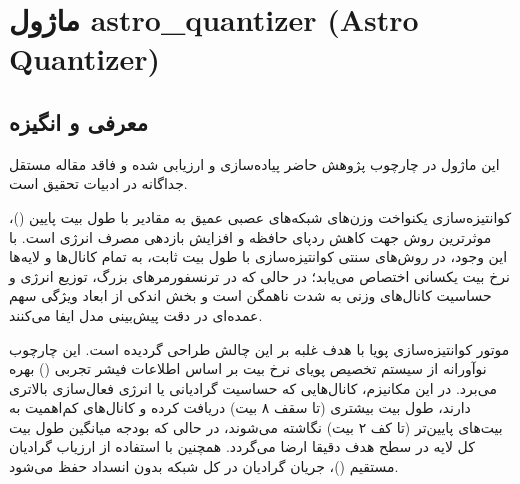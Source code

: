 \section{ماژول astro\_quantizer (Astro Quantizer)}
\label{sec:module_astro_quantizer}

\subsection{معرفی و انگیزه}
این ماژول در چارچوب پژوهش حاضر پیاده‌سازی و ارزیابی شده و فاقد مقاله مستقل جداگانه در ادبیات تحقیق است.

کوانتیزه‌سازی یکنواخت وزن‌های شبکه‌های عصبی عمیق به مقادیر با طول بیت پایین ()، موثرترین روش جهت کاهش ردپای حافظه و افزایش بازدهی مصرف انرژی است. با این وجود، در روش‌های سنتی کوانتیزه‌سازی با طول بیت ثابت، به تمام کانال‌ها و لایه‌ها نرخ بیت یکسانی اختصاص می‌یابد؛ در حالی که در ترنسفورمرهای بزرگ، توزیع انرژی و حساسیت کانال‌های وزنی به شدت ناهمگن است و بخش اندکی از ابعاد ویژگی سهم عمده‌ای در دقت پیش‌بینی مدل ایفا می‌کنند.

موتور کوانتیزه‌سازی پویا  با هدف غلبه بر این چالش طراحی گردیده است. این چارچوب نوآورانه از سیستم تخصیص پویای نرخ بیت بر اساس اطلاعات فیشر تجربی () بهره می‌برد. در این مکانیزم، کانال‌هایی که حساسیت گرادیانی یا انرژی فعال‌سازی بالاتری دارند، طول بیت بیشتری (تا سقف ۸ بیت) دریافت کرده و کانال‌های کم‌اهمیت به بیت‌های پایین‌تر (تا کف ۲ بیت) نگاشته می‌شوند، در حالی که بودجه میانگین طول بیت کل لایه در سطح هدف دقیقا ارضا می‌گردد. همچنین با استفاده از ارزیاب گرادیان مستقیم ()، جریان گرادیان در کل شبکه بدون انسداد حفظ می‌شود.

